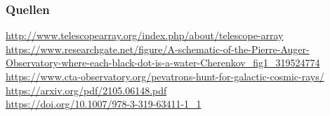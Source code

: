 \documentclass[aspectratio=1610, 9pt]{beamer}
\begin{document}
\begin{frame}\frametitle{Quellen}
\url{http://www.telescopearray.org/index.php/about/telescope-array} \\
\url{https://www.researchgate.net/figure/A-schematic-of-the-Pierre-Auger-Observatory-where-each-black-dot-is-a-water-Cherenkov_fig1_319524774} \\
\url{https://www.cta-observatory.org/pevatrons-hunt-for-galactic-cosmic-rays/} \\
\url{https://arxiv.org/pdf/2105.06148.pdf} \\
\url{https://doi.org/10.1007/978-3-319-63411-1_1} \\
\end{frame}
\end{document}
